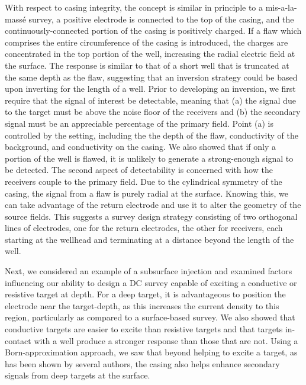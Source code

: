 With respect to casing integrity, the concept is similar in principle to a mis-a-la-mass\'e survey, a positive electrode is connected to the top of the casing, and the continuously-connected portion of the casing is positively charged. If a flaw which comprises the entire circumference of the casing is introduced, the charges are concentrated in the top portion of the well, increasing the radial electric field at the surface. The response is similar to that of a short well that is truncated at the same depth as the flaw, suggesting that an inversion strategy could be based upon inverting for the length of a well. Prior to developing an inversion, we first require that the signal of interest be detectable, meaning that (a) the signal due to the target must be above the noise floor of the receivers and (b) the secondary signal must be an appreciable percentage of the primary field. Point (a) is controlled by the setting, including the the depth of the flaw, conductivity of the background, and conductivity on the casing. We also showed that if only a portion of the well is flawed, it is unlikely to generate a strong-enough signal to be detected. The second aspect of detectability is concerned with how the receivers couple to the primary field. Due to the cylindrical symmetry of the casing, the signal from a flaw is purely radial at the surface. Knowing this, we can take advantage of the return electrode and use it to alter the geometry of the source fields. This suggests a survey design strategy consisting of two orthogonal lines of electrodes, one for the return electrodes, the other for receivers, each starting at the wellhead and terminating at a distance beyond the length of the well.

Next, we considered an example of a subsurface injection and examined factors influencing our ability to design a DC survey capable of exciting a conductive or resistive target at depth. For a deep target, it is advantageous to position the electrode near the target-depth, as this increases the current density to this region, particularly as compared to a surface-based survey. We also showed that conductive targets are easier to excite than resistive targets and that targets in-contact with a well produce a stronger response than those that are not. Using a Born-approximation approach, we saw that beyond helping to excite a target, as has been shown by several authors, the casing also helps enhance secondary signals from deep targets at the surface.

